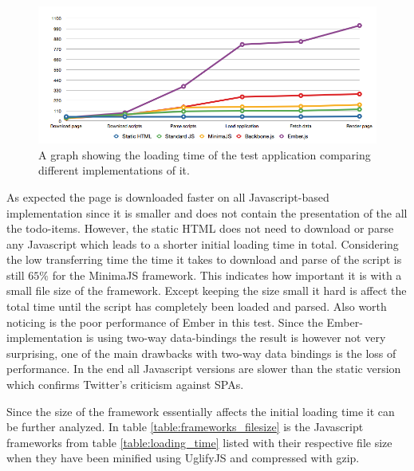 \begin{figure}[H]
	\centerline{\includegraphics[width=160mm]{gfx/load_time.png}}
	\caption{A graph showing the loading time of the test application comparing different implementations of it.}
	\label{fig:loading_time}
\end{figure}

As expected the page is downloaded faster on all Javascript-based implementation since it is smaller and does not contain the presentation of the all the todo-items. However, the static HTML does not need to download or parse any Javascript which leads to a shorter initial loading time in total. Considering the low transferring time the time it takes to download and parse of the script is still $65\%$ for the MinimaJS framework. This indicates how important it is with a small file size of the framework. Except keeping the size small it hard is affect the total time until the script has completely been loaded and parsed. Also worth noticing is the poor performance of Ember in this test. Since the Ember-implementation is using two-way data-bindings the result is however not very surprising, one of the main drawbacks with two-way data bindings is the loss of performance. In the end all Javascript versions are slower than the static version which confirms Twitter's criticism \cite{twitter_no_hashbang} against SPAs.

Since the size of the framework essentially affects the initial loading time it can be further analyzed. In table \ref{table:frameworks_filesize} is the Javascript frameworks from table \ref{table:loading_time} listed with their respective file size when they have been minified using UglifyJS and compressed with gzip.

